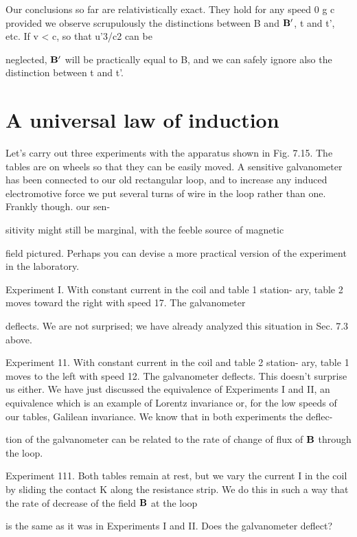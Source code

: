 Our conclusions so far are relativistically exact. They hold for
any speed 0 g c provided we observe scrupulously the distinctions
between B and $\mathbf{B}'$, t and t', etc. If v < c, so that u'3/c2 can be

neglected, $\mathbf{B}'$ will be practically equal to B, and we can safely ignore
also the distinction between t and t'.

\section{A universal law of induction}

Let's carry out three experiments with the apparatus shown in
Fig. 7.15. The tables are on wheels so that they can be easily moved.
A sensitive galvanometer has been connected to our old rectangular
loop, and to increase any induced electromotive force we put several
turns of wire in the loop rather than one. Frankly though. our sen-

sitivity might still be marginal, with the feeble source of magnetic

field pictured. Perhaps you can devise a more practical version of
the experiment in the laboratory.

Experiment I. With constant current in the coil and table 1 station-
ary, table 2 moves toward the right with speed 17. The galvanometer

deflects. We are not surprised; we have already analyzed this situation
in Sec. 7.3 above.

Experiment 11. With constant current in the coil and table 2 station-
ary, table 1 moves to the left with speed 12. The galvanometer
deflects. This doesn't surprise us either. We have just discussed the
equivalence of Experiments I and II, an equivalence which is an example
of Lorentz invariance or, for the low speeds of our tables,
Galilean invariance. We know that in both experiments the deflec-

tion of the galvanometer can be related to the rate of change of flux
of $\mathbf{B}$ through the loop.

Experiment 111. Both tables remain at rest, but we vary the current
I in the coil by sliding the contact K along the resistance strip. We
do this in such a way that the rate of decrease of the field $\mathbf{B}$ at the loop

is the same as it was in Experiments I and II. Does the galvanometer
deflect?

